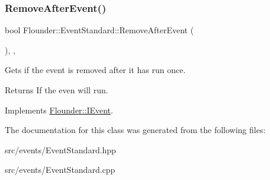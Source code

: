 \subsubsection{\texorpdfstring{Remove\+After\+Event()}{RemoveAfterEvent()}}
{\footnotesize\ttfamily bool Flounder\+::\+Event\+Standard\+::\+Remove\+After\+Event (\begin{DoxyParamCaption}{ }\end{DoxyParamCaption})\hspace{0.3cm}{\ttfamily [inline]}, {\ttfamily [override]}, {\ttfamily [virtual]}}



Gets if the event is removed after it has run once. 

\begin{DoxyReturn}{Returns}
If the even will run. 
\end{DoxyReturn}


Implements \hyperlink{class_flounder_1_1_i_event_a69893f543c31d93243833a4df1afa041}{Flounder\+::\+I\+Event}.



The documentation for this class was generated from the following files\+:\begin{DoxyCompactItemize}
\item 
src/events/Event\+Standard.\+hpp\item 
src/events/Event\+Standard.\+cpp\end{DoxyCompactItemize}
